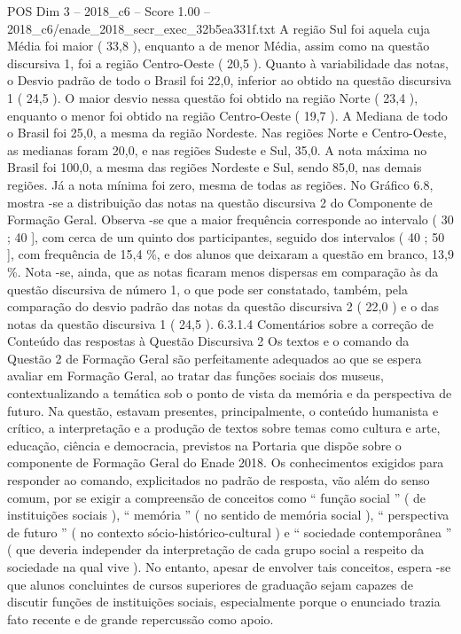 \begin{textsample}{POS Dim 3 – 2018\_c6 – Score 1.00 – 2018\_c6/enade\_2018\_secr\_exec\_32b5ea331f.txt}
A região Sul foi aquela cuja Média foi maior ( 33,8 ), enquanto a de menor Média, assim como na questão discursiva 1, foi a região Centro-Oeste ( 20,5 ).
Quanto à variabilidade das notas, o Desvio padrão de todo o Brasil foi 22,0, inferior ao obtido na questão discursiva 1 ( 24,5 ).
O maior desvio nessa questão foi obtido na região Norte ( 23,4 ), enquanto o menor foi obtido na região Centro-Oeste ( 19,7 ).
A Mediana de todo o Brasil foi 25,0, a mesma da região Nordeste.
Nas regiões Norte e Centro-Oeste, as medianas foram 20,0, e nas regiões Sudeste e Sul, 35,0.
A nota máxima no Brasil foi 100,0, a mesma das regiões Nordeste e Sul, sendo 85,0, nas demais regiões.
Já a nota mínima foi zero, mesma de todas as regiões.
No Gráfico 6.8, mostra -se a distribuição das notas na questão discursiva 2 do Componente de Formação Geral.
Observa -se que a maior frequência corresponde ao intervalo ( 30 ; 40 ], com cerca de um quinto dos participantes, seguido dos intervalos ( 40 ; 50 ], com frequência de 15,4 \%, e dos alunos que deixaram a questão em branco, 13,9 \%.
Nota -se, ainda, que as notas ficaram menos dispersas em comparação às da questão discursiva de número 1, o que pode ser constatado, também, pela comparação do desvio padrão das notas da questão discursiva 2 ( 22,0 ) e o das notas da questão discursiva 1 ( 24,5 ). 6.3.1.4 Comentários sobre a correção de Conteúdo das respostas à Questão Discursiva 2 Os textos e o comando da Questão 2 de Formação Geral são perfeitamente adequados ao que se espera avaliar em Formação Geral, ao tratar das funções sociais dos museus, contextualizando a temática sob o ponto de vista da memória e da perspectiva de futuro.
Na questão, estavam presentes, principalmente, o conteúdo humanista e crítico, a interpretação e a produção de textos sobre temas como cultura e arte, educação, ciência e democracia, previstos na Portaria que dispõe sobre o componente de Formação Geral do Enade 2018.
Os conhecimentos exigidos para responder ao comando, explicitados no padrão de resposta, vão além do senso comum, por se exigir a compreensão de conceitos como “ função social ” ( de instituições sociais ), “ memória ” ( no sentido de memória social ), “ perspectiva de futuro ” ( no contexto sócio-histórico-cultural ) e “ sociedade contemporânea ” ( que deveria independer da interpretação de cada grupo social a respeito da sociedade na qual vive ).
No entanto, apesar de envolver tais conceitos, espera -se que alunos concluintes de cursos superiores de graduação sejam capazes de discutir funções de instituições sociais, especialmente porque o enunciado trazia fato recente e de grande repercussão como apoio.

\end{textsample}
